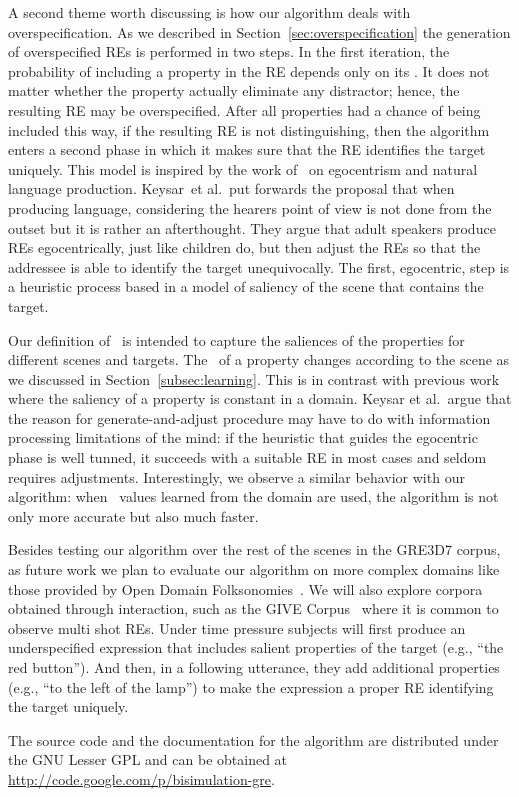 A second theme worth discussing is how our algorithm deals with overspecification. As we described in Section~\ref{sec:overspecification} the generation of overspecified REs is performed in two steps. In the first iteration, the probability of including a property in the RE depends only on its \puse. It does not matter whether the property actually eliminate any distractor; hence, the resulting RE may be overspecified. After all properties had a chance of being included this way, if the resulting RE is not distinguishing, then the algorithm enters a second phase in which it makes sure that the RE identifies the target uniquely.  This model is inspired by the work of~ on egocentrism and natural language production.  Keysar~et al.\ put forwards the proposal that when producing language, considering the hearers point of view is not done from the outset but it is rather an afterthought. They argue that adult speakers produce REs egocentrically, just like children do, but then adjust the REs so that the addressee is able to identify the target unequivocally. The first, egocentric, step is a heuristic process based in a model of saliency of the scene that contains the target. 

Our definition of \puse\ is intended to capture the saliences of the properties for different scenes and targets. The \puse\ of a property changes according to the scene as we discussed in Section~\ref{subsec:learning}. This is in contrast with previous work where the saliency of a property is constant in a domain. Keysar et al.~argue that the reason for generate-and-adjust procedure may have to do with information processing limitations of the mind: if the heuristic that guides the egocentric phase is well tunned, it succeeds with a suitable RE in most cases and seldom requires adjustments. Interestingly, we observe a similar behavior with our algorithm: when \puse\ values learned from the domain are used, the algorithm is not only more accurate but also much faster. 

Besides testing our algorithm over the rest of the scenes in the GRE3D7 corpus, as future work we plan to evaluate our algorithm on more complex domains like those provided by Open Domain Folksonomies~\cite{pacheco-duboue-dominguez:2012:NAACL-HLT}. We will also explore corpora obtained through interaction, such as the GIVE Corpus~\cite{GarGarKolStr10} where it is common to observe multi shot REs. Under time pressure subjects will first produce an underspecified expression that includes salient properties of the target (e.g., ``the red button'').  And then, in a following utterance, they add additional properties (e.g., ``to the left of the lamp'') to make the expression a proper RE  identifying the target uniquely.

The source code and the documentation for the algorithm are distributed under the GNU Lesser GPL and can be obtained at \url{http://code.google.com/p/bisimulation-gre}.
